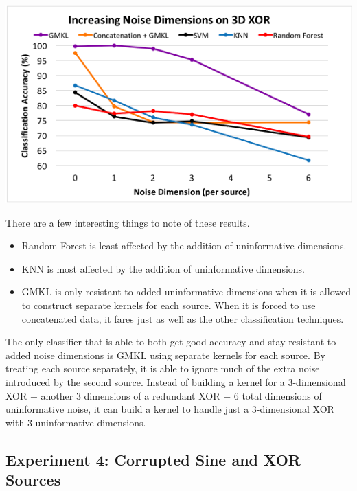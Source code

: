 \documentclass{article}
\begin{document}
\begin{minipage}{\textwidth}
    \centering
    \includegraphics[scale=0.7]{Noise_Dim_line.png}
    \label{fig:noise_dim_line}
\end{minipage}

There are a few interesting things to note of these results.
\begin{itemize}
    \item Random Forest is least affected by the addition of uninformative
        dimensions.
    \item KNN is most affected by the addition of uninformative dimensions.
    \item GMKL is only resistant to added uninformative dimensions when it is
        allowed to construct separate kernels for each source. When it is
        forced to use concatenated data, it fares just as well as the other
        classification techniques.
\end{itemize}

The only classifier that is able to both get good accuracy and stay resistant
to added noise dimensions is GMKL using separate kernels for each source. By
treating each source separately, it is able to ignore much of the extra noise
introduced by the second source. Instead of building a kernel for a
3-dimensional XOR + another 3 dimensions of a redundant XOR + 6 total
dimensions of uninformative noise, it can build a kernel to handle just a
3-dimensional XOR with 3 uninformative dimensions.



\subsection*{Experiment 4: Corrupted Sine and XOR Sources}
\end{document}
